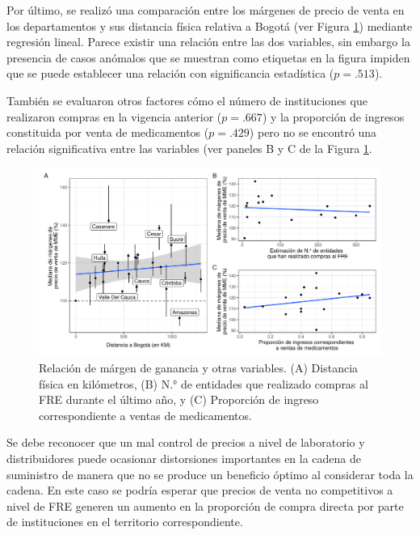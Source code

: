 \documentclass[
]{book}
\begin{document}
Por último, se realizó una comparación entre los márgenes de precio de venta en los departamentos y sus distancia física relativa a Bogotá (ver Figura \ref{fig:relacionMargenesCosto}) mediante regresión lineal. Parece existir una relación entre las dos variables, sin embargo la presencia de casos anómalos que se muestran como etiquetas en la figura impiden que se puede establecer una relación con significancia estadística (\(p = .513\)).

También se evaluaron otros factores cómo el número de instituciones que realizaron compras en la vigencia anterior (\(p = .667\)) y la proporción de ingresos constituida por venta de medicamentos (\(p = .429\)) pero no se encontró una relación significativa entre las variables (ver paneles B y C de la Figura \ref{fig:relacionMargenesCosto}.

\begin{figure}[b!]

{\centering \includegraphics[width=0.95\linewidth]{InformeFinal_files/figure-latex/relacionMargenesCosto-1} 

}

\caption{Relación de márgen de ganancia y otras variables. (A) Distancia física en kilómetros, (B) N.° de entidades que realizado compras al FRE durante el último año, y (C) Proporción de ingreso correspondiente a ventas de medicamentos.}\label{fig:relacionMargenesCosto}
\end{figure}

Se debe reconocer que un mal control de precios a nivel de laboratorio y distribuidores puede ocasionar distorsiones importantes en la cadena de suministro de manera que no se produce un beneficio óptimo al considerar toda la cadena. En este caso se podría esperar que precios de venta no competitivos a nivel de FRE generen un aumento en la proporción de compra directa por parte de instituciones en el territorio correspondiente.
\end{document}
